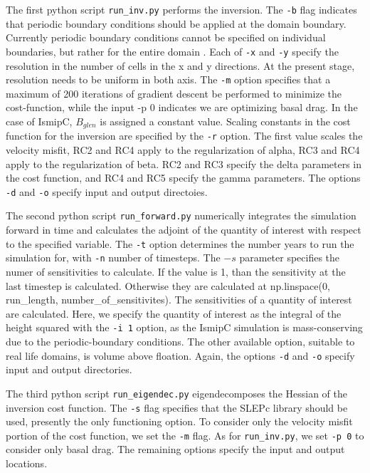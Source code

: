 \documentclass[11pt, reqno, nocenter]{article}
\begin{document}
The first python script {\tt run\_inv.py} performs the inversion. The {\tt -b} flag indicates that periodic boundary conditions should be applied at the domain boundary. Currently periodic boundary conditions cannot be specified on individual boundaries, but rather for the entire domain . Each of {\tt -x} and {\tt -y} specify the resolution in the number of cells in the x and y directions. At the present stage, resolution needs to be uniform in both axis. The {\tt -m} option specifies that a maximum of 200 iterations of gradient descent be performed to minimize the cost-function, while the input {-p 0} indicates we are optimizing basal drag. In the case of IsmipC, $B_{glen}$ is assigned a constant value. Scaling constants in the cost function for the inversion are specified by the {\tt -r} option. The first value scales the velocity misfit, RC2 and RC4 apply to the regularization of alpha, RC3 and RC4 apply to the regularization of beta. RC2 and RC3 specify the delta parameters in the cost function, and RC4 and RC5 specify the gamma parameters. The options {\tt -d} and {\tt -o} specify input and output directoies.

The second python script {\tt run\_forward.py} numerically integrates the simulation forward in time and calculates the adjoint of the quantity of interest with respect to the specified variable. The {\tt -t} option determines the number years to run the simulation for, with {\tt -n} number of timesteps. The $-s$ parameter specifies the numer of sensitivities to calculate. If the value is 1, than the sensitivity at the last timestep is calculated. Otherwise they are calculated at np.linspace(0, run\_length, number\_of\_sensitivites). The sensitivities of a quantity of interest are calculated. Here, we specify the quantity of interest as the integral of the height squared with the {\tt -i 1} option, as the IsmipC simulation is mass-conserving due to the periodic-boundary conditions. The other available option, suitable to real life domains, is volume above floation. Again, the options {\tt -d} and {\tt -o} specify input and output directories.

The third python script {\tt run\_eigendec.py} eigendecomposes the Hessian of the inversion cost function. The {\tt -s} flag specifies that the SLEPc library should be used, presently the only functioning option. To consider only the velocity misfit portion of the cost function, we set the {\tt -m} flag. As for {\tt run\_inv.py}, we set {\tt -p 0} to consider only basal drag. The remaining options specify the input and output locations. 
\end{document}
